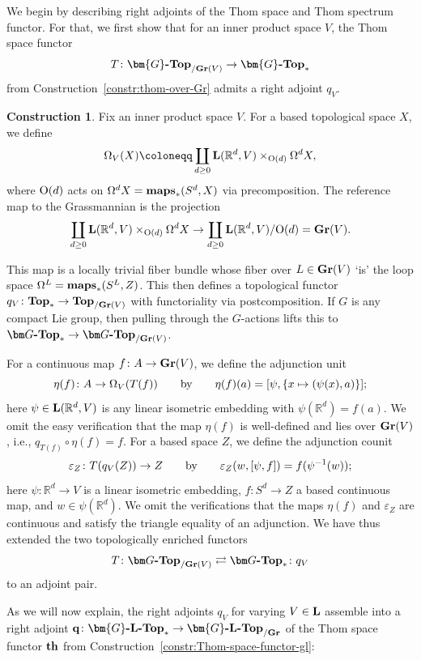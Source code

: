 \documentclass[reqno]{memo-l}
\theoremstyle{mythm}
\theoremstyle{definition}
\newtheorem{constr}[thm]{Construction}
\numberwithin{equation}{section}
\newcommand{\R} {{\mathbb{R}}}
\renewcommand{\epsilon}{\varepsilon}
\newcommand{\cat}[1]{\textbf{\textup{#1}}}
\newcommand{\maps}{\cat{maps}}
\renewcommand{\O}{{\textup{O}}}
\newcommand{\GTop}[1]{\cat{$\bm{#1}$-Top}}
\newcommand{\Gospc}[1]{\cat{$\bm{#1}$-$\cat{L}$-Top}}
\newcommand{\Gr}{\cat{Gr}}
\begin{document}
We begin by describing right adjoints of the Thom space and Thom spectrum functor. For that, we first show that for an inner product space $V$, the Thom space functor 
\[ T\colon\GTop{G}_{/\Gr(V)}\to \GTop{G}_*\] from Construction~\ref{constr:thom-over-Gr} admits a right adjoint $q_V$. 
\begin{constr}\label{constr:thom-level-right-adjt}Fix an inner product space $V$.
For a based topological space $X$, 
we define \[\Omega_V(X)\coloneqq \coprod_{d\ge0}\cat L(\R^d,V)\times_{\O(d)}\Omega^dX,\] where $\O(d)$ acts on $\Omega^dX=\maps_*(S^d,X)$ via precomposition.
The reference map to the Grassmannian is the projection \[\coprod_{d\ge0}\cat L(\R^d,V)\times_{\O(d)}\Omega^dX\to \coprod_{d\ge0}\cat L(\R^d,V)/\O(d)=\Gr(V).\] 

 This map is a locally trivial fiber bundle whose fiber over $L\in \Gr(V)$ `is'
  the loop space $\Omega^L=\maps_*(S^L,Z)$. This then defines a topological functor $q_V\colon\cat{Top}_*\to\cat{Top}_{/\cat{Gr}(V)}$ with functoriality via postcomposition. If $G$ is any compact Lie group, then pulling through the $G$-actions lifts this to $\cat{$\bm G$-Top}_*\to\cat{$\bm G$-Top}_{/\cat{Gr}(V)}$.

  For a continuous map $f\colon A\to\Gr(V)$, we define the adjunction unit
  \[
     \eta(f)\colon  A \to \Omega_V(T(f)) \text{\qquad by\qquad} \eta(f)(a) = [\psi,\{x\mapsto (\psi(x),a)\}]; 
  \]
  here $\psi\in\cat{L}(\mathbb R^d,V)$ is any linear isometric embedding with $\psi(\mathbb R^d)=f(a)$.
  We omit the easy verification that the map $\eta(f)$ is well-defined and lies over $\Gr(V)$, i.e., $q_{T(f)}\circ\eta(f)=f$.
  For a based space $Z$, we define the adjunction counit
  \[ 
    \epsilon_Z\colon  T(q_V(Z)) \to Z \text{\qquad by\qquad}
    \epsilon_Z(w,[\psi,f]) =  f(\psi^{-1}(w));
  \]
  here $\psi\colon\mathbb R^d\to V$ is a linear isometric embedding, $f\colon S^d\to Z$ a based continuous map,
  and $w\in \psi(\mathbb R^d)$. We omit the verifications that the maps $\eta(f)$ and $\epsilon_Z$
  are continuous and satisfy the triangle equality of an adjunction.
  We have thus extended the two topologically enriched functors
  \begin{align}\label{eq:Thom-level-rightadjt} T\colon \cat{$\bm G$-Top}_{/\Gr(V)}\rightleftarrows \cat{$\bm G$-Top}_*\colon q_V\end{align}
  to an adjoint pair.
\end{constr}

As we will now explain, the right adjoints $q_V$ for varying $V\in\cat L$ assemble into a right adjoint $\cat{q}\colon \Gospc{G}_*\to \Gospc{G}_{/\Gr}$ of the Thom space functor $\cat{th}$ from Construction~\ref{constr:Thom-space-functor-gl}:
\end{document}
